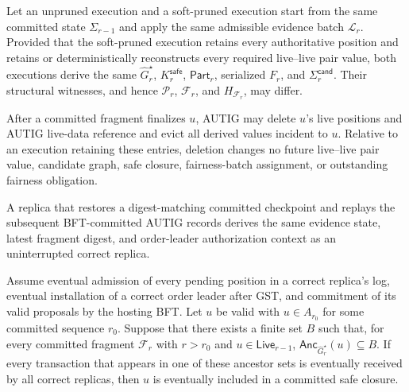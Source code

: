 \begin{theorem}
\label{thm:pruning_safety}
Let an unpruned execution and a soft-pruned execution start from the same committed state $\Sigma_{r-1}$ and apply the same admissible evidence batch $\mathcal L_r$.
Provided that the soft-pruned execution retains every authoritative position and retains or deterministically reconstructs every required live--live pair value, both executions derive the same $\widehat G_r^\star$, $K_r^{\mathsf{safe}}$, $\mathsf{Part}_r$, serialized $F_r$, and $\Sigma_r^{\mathsf{cand}}$.
Their structural witnesses, and hence $\mathcal P_r$, $\mathcal F_r$, and $H_{\mathcal F_r}$, may differ.
\end{theorem}

\begin{theorem}
\label{thm:hard-deletion}
After a committed fragment finalizes $u$, AUTIG may delete $u$'s live positions and AUTIG live-data reference and evict all derived values incident to $u$.
Relative to an execution retaining these entries, deletion changes no future live--live pair value, candidate graph, safe closure, fairness-batch assignment, or outstanding fairness obligation.
\end{theorem}

\begin{theorem}
\label{thm:recovery}
A replica that restores a digest-matching committed checkpoint and replays the subsequent BFT-committed AUTIG records derives the same evidence state, latest fragment digest, and order-leader authorization context as an uninterrupted correct replica.
\end{theorem}

\begin{proposition}
\label{prop:stabilized-progress}
Assume eventual admission of every pending position in a correct replica's log, eventual installation of a correct order leader after GST, and commitment of its valid proposals by the hosting BFT. Let $u$ be valid with $u\in A_{r_0}$ for some committed sequence $r_0$.
Suppose that there exists a finite set $B$ such that, for every committed fragment $\mathcal F_r$ with $r>r_0$ and
$u\in\mathsf{Live}_{r-1}$, $\mathsf{Anc}_{\widehat G_r^\star}(u)\subseteq B$. If every transaction that appears in one of these ancestor sets is eventually received by all correct replicas, then $u$ is eventually included in a committed safe closure.
\end{proposition}

